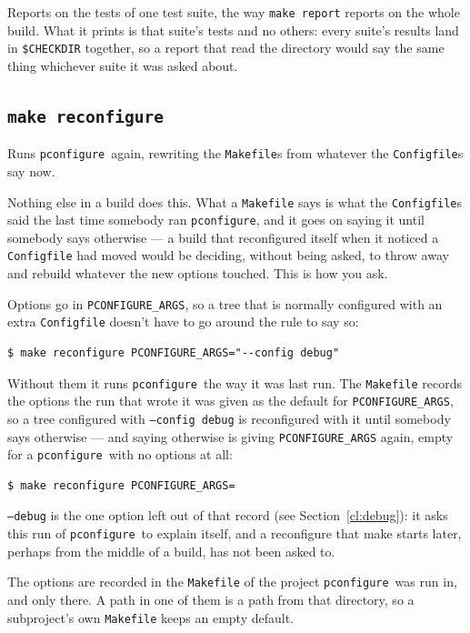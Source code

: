 \documentclass{article}
\newcommand{\pconfigure}{\texttt{pconfigure}}
\begin{document}
Reports on the tests of one test suite, the way \texttt{make report}
reports on the whole build.  What it prints is that suite's tests and
no others: every suite's results land in \texttt{\$CHECKDIR}
together, so a report that read the directory would say the same thing
whichever suite it was asked about.

\subsection{\texttt{make reconfigure} \label{make:reconfigure}}

Runs \pconfigure\ again, rewriting the \texttt{Makefile}s from
whatever the \texttt{Configfile}s say now.

Nothing else in a build does this.  What a \texttt{Makefile} says is
what the \texttt{Configfile}s said the last time somebody ran
\pconfigure, and it goes on saying it until somebody says otherwise
--- a build that reconfigured itself when it noticed a
\texttt{Configfile} had moved would be deciding, without being asked,
to throw away and rebuild whatever the new options touched.  This is
how you ask.

Options go in \texttt{PCONFIGURE\_ARGS}, so a tree that is normally
configured with an extra \texttt{Configfile} doesn't have to go around
the rule to say so:

\begin{verbatim}
$ make reconfigure PCONFIGURE_ARGS="--config debug"
\end{verbatim}

Without them it runs \pconfigure\ the way it was last run.  The
\texttt{Makefile} records the options the run that wrote it was given
as the default for \texttt{PCONFIGURE\_ARGS}, so a tree configured
with \texttt{--config debug} is reconfigured with it until somebody
says otherwise --- and saying otherwise is giving
\texttt{PCONFIGURE\_ARGS} again, empty for a \pconfigure\ with no
options at all:

\begin{verbatim}
$ make reconfigure PCONFIGURE_ARGS=
\end{verbatim}

\texttt{--debug} is the one option left out of that record (see
Section~\ref{cl:debug}): it asks this run of \pconfigure\ to explain
itself, and a reconfigure that make starts later, perhaps from the
middle of a build, has not been asked to.

The options are recorded in the \texttt{Makefile} of the project
\pconfigure\ was run in, and only there.  A path in one of them is a
path from that directory, so a subproject's own \texttt{Makefile}
keeps an empty default.
\end{document}
